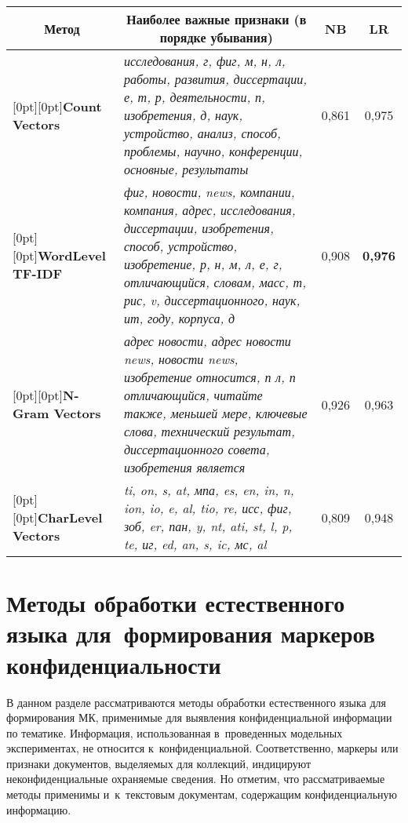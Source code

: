 \begin{multicols}{2}
\begin{table*}
\begin{center}
     \begin{tabular}{|l|p{100mm}|c|c|}
     \hline
\multicolumn{1}{|c|}{Метод} &\multicolumn{1}{c|}{Наиболее важные признаки 
(в порядке убывания)}&\textbf{NB}&\textbf{LR}\\
\hline
\multicolumn{1}{|l|}{\raisebox{-12pt}[0pt][0pt]{\textbf{Count Vectors}}}&\textit{исследования, г, фиг, м, н, л, работы, развития, диссертации, 
е, т, р, деятельности, п, изобретения, д, наук, устройство, анализ, способ, проблемы, 
научно, конференции, основные, результаты}&0,861& 0,975\\
\hline
\multicolumn{1}{|l|}{\raisebox{-18pt}[0pt][0pt]{\textbf{WordLevel  
TF-IDF}}}&\textit{фиг, новости, news, компании, компания, адрес, исследования, диссертации, 
изобретения, способ, устройство, изобретение, р, н, м, л, е, г, отличающийся, словам, масс, 
т, рис, v, диссертационного, наук, ит, году, корпуса, д}&0,908&\textbf{0,976}\\
\hline
\multicolumn{1}{|l|}{\raisebox{-18pt}[0pt][0pt]{\textbf{N-Gram Vectors}}}&\textit{адрес новости, адрес новости news, новости news, 
изобретение относится, п л, п отличающийся, читайте также, меньшей мере, ключевые 
слова, технический результат, диссертационного совета, изобретения 
является}&0,926&0,963\\
\hline
\multicolumn{1}{|l|}{\raisebox{-6pt}[0pt][0pt]{\textbf{CharLevel Vectors}}}&\textit{ti, on, s, at, мпа, es, en, in, n, ion, io, e, al, tio, re, исс, фиг, 
зоб, er, пан, y, nt, ati, st, l, p, te, иг, ed, an, s, ic, мс, al}&0,809&0,948\\
\hline
\end{tabular}
\end{center}
\end{table*}

\section{Методы обработки естественного языка 
для~формирования маркеров конфиденциальности} %
  
  В данном разделе рассматриваются методы обработки естественного языка 
для формирования МК, применимые для выявления кон\-фи\-ден\-ци\-альной 
информации по тематике. Информация, использованная в~проведенных 
модельных экспериментах, не относится к~конфиденциальной. 
Соответственно, маркеры или признаки документов, выделяемых для 
коллекций, индицируют неконфиденциальные охраняемые сведения. Но 
отметим, что рассматриваемые методы применимы и~к~текстовым 
документам, содержащим конфиденциальную информацию.
  

\end{multicols}
